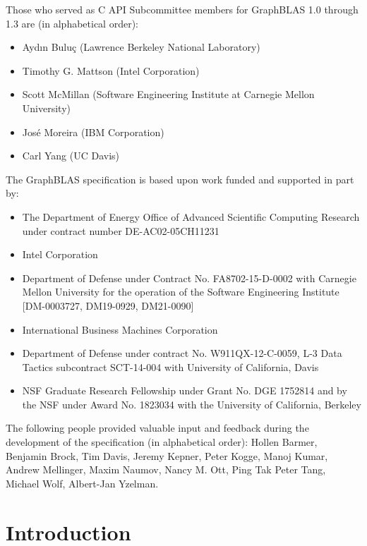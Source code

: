 \documentclass[11pt]{extbook}
\begin{document}
Those who served as C API Subcommittee members for GraphBLAS 1.0 through 1.3 are (in alphabetical order):
\begin{itemize}
\item Ayd\i n Bulu\c{c} (Lawrence Berkeley National Laboratory)
\item Timothy G. Mattson (Intel Corporation)
\item Scott McMillan (Software Engineering Institute at Carnegie Mellon University)
\item Jos\'e Moreira (IBM Corporation)
\item Carl Yang (UC Davis)
\end{itemize}


The GraphBLAS specification is based upon work funded and supported in part by:
\begin{itemize}
\item The Department of Energy Office of Advanced Scientific Computing Research under contract number DE-AC02-05CH11231
\item Intel Corporation
\item Department of Defense under Contract No. FA8702-15-D-0002 with Carnegie Mellon University for the operation of the Software Engineering Institute [DM-0003727, DM19-0929, DM21-0090]
\item International Business Machines Corporation
\item Department of Defense under contract No. W911QX-12-C-0059, L-3 Data Tactics subcontract SCT-14-004 with University of California, Davis
\item NSF Graduate Research Fellowship under Grant No. DGE 1752814 and by the NSF under Award No. 1823034 with the University of California, Berkeley
\end{itemize}

The following people provided valuable input and feedback during the development of the specification (in alphabetical order):
Hollen Barmer, Benjamin Brock, Tim Davis, Jeremy Kepner, Peter Kogge, Manoj Kumar, Andrew Mellinger, 
Maxim Naumov, Nancy M. Ott, Ping Tak Peter Tang, Michael Wolf, Albert-Jan Yzelman.
\vfill
\pagebreak


\chapter{Introduction}
\end{document}
